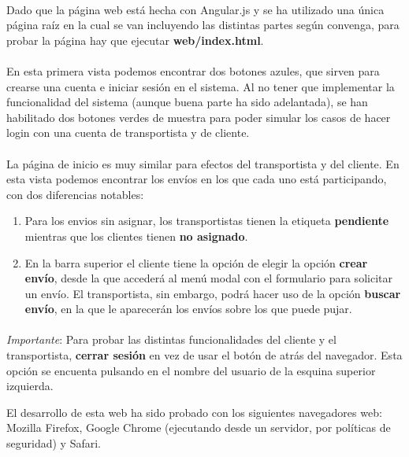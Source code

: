 \documentclass[10pt, a4paper,spanish]{article}
\begin{document}
		\paragraph{}
		Dado que la página web está hecha con Angular.js y se ha utilizado una única página raíz en la cual se van incluyendo las distintas partes según convenga, para probar la página hay que ejecutar \textbf{web/index.html}.

		\paragraph{}
		En esta primera vista podemos encontrar dos botones azules, que sirven para crearse una cuenta e iniciar sesión en el sistema. Al no tener que implementar la funcionalidad del sistema (aunque buena parte ha sido adelantada), se han habilitado dos botones verdes de muestra para poder simular los casos de hacer login con una cuenta de transportista y de cliente.

		\paragraph{}
		La página de inicio es muy similar para efectos del transportista y del cliente. En esta vista podemos encontrar los envíos en los que cada uno está participando, con dos diferencias notables:

		\begin{enumerate}
				\item Para los envios sin asignar, los transportistas tienen la etiqueta \textbf{pendiente} mientras que los clientes tienen \textbf{no asignado}.
				\item En la barra superior el cliente tiene la opción de elegir la opción \textbf{crear envío}, desde la que accederá al menú modal con el formulario para solicitar un envío. El transportista, sin embargo, podrá hacer uso de la opción \textbf{buscar envío}, en la que le aparecerán los envíos sobre los que puede pujar.
		\end{enumerate}

		\paragraph{}
		\textit{Importante}: Para probar las distintas funcionalidades del cliente y el transportista, \textbf{cerrar sesión} en vez de usar el botón de atrás del navegador. Esta opción se encuenta pulsando en el nombre del usuario de la esquina superior izquierda.

		El desarrollo de esta web ha sido probado con los siguientes navegadores web: Mozilla Firefox, Google Chrome (ejecutando desde un servidor, por políticas de seguridad) y Safari.
\end{document}
